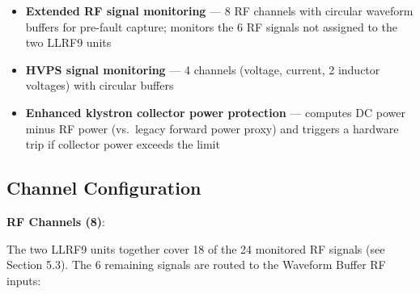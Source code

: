 \begin{itemize}
\tightlist
\item
  \textbf{Extended RF signal monitoring} --- 8 RF channels with circular waveform buffers for pre-fault capture; monitors the 6 RF signals not assigned to the two LLRF9 units
\item
  \textbf{HVPS signal monitoring} --- 4 channels (voltage, current, 2 inductor voltages) with circular buffers
\item
  \textbf{Enhanced klystron collector power protection} --- computes DC power minus RF power (vs.~legacy forward power proxy) and triggers a hardware trip if collector power exceeds the limit
\end{itemize}

\subsection{Channel Configuration}\label{channel-configuration}

\textbf{RF Channels (8)}:

The two LLRF9 units together cover 18 of the 24 monitored RF signals (see Section 5.3). The 6 remaining signals are routed to the Waveform Buffer RF inputs:

